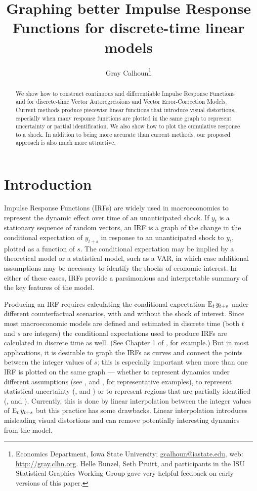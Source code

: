 \documentclass[12pt,fleqn]{article}
\title{Graphing better Impulse Response Functions for discrete-time
  linear models}
\author{Gray Calhoun\thanks{%
    Economics Department, Iowa State University;%
    \protect\url{gcalhoun@iastate.edu},%
    web: \protect\url{http://gray.clhn.org}.%
    Helle Bunzel, Seth Pruitt, and participants in the ISU Statistical
    Graphics Working Group gave very helpful feedback on early
    versions of this paper.}}
\begin{document}
\maketitle
\begin{abstract}\noindent%
  We show how to construct continuous and differentiable
  Impulse Response Functions and for discrete-time Vector Autoregressions
  and Vector Error-Correction Models. Current methods produce piecewise linear
  functions that introduce visual distortions, especially when many
  response functions are plotted in the same graph to represent
  uncertainty or partial identification. We also show how to plot the
  cumulative response to a shock. In addition to being more accurate
  than current methods, our proposed approach is also much more attractive.
\end{abstract}

\tableofcontents
\newpage

\section{Introduction}
\label{S1}

Impulse Response Functions (IRFs) are widely used in macroeconomics
to represent the dynamic effect over time of an unanticipated
shock. If $y_t$ is a stationary sequence of random vectors, an IRF
is a graph of the change in the conditional expectation of $y_{t+s}$
in response to an unanticipated shock to $y_t$, plotted as a function
of $s$. The conditional expectation may be implied by a theoretical
model or a statistical model, such as a VAR, in which case additional
assumptions may be necessary to identify the shocks of economic
interest. In either of these cases, IRFs provide a parsimonious and
interpretable summary of the key features of the model.

Producing an IRF requires calculating the conditional expectation
$\operatorname{E}_t y_{t+s}$ under different counterfactual scenarios, with and
without the shock of interest. Since most macroeconomic models are
defined and estimated in discrete time (both $t$ and $s$ are integers)
the conditional expectations used to produce IRFs are calculated in
discrete time as well. (See Chapter 1 of \citealp{Ham:94}, for
example.) But in most applications, it is desirable to graph the IRFs
as curves and connect the points between the integer values of $s$;
this is especially important when more than one IRF is plotted on
the same graph --- whether to represent dynamics under different
assumptions (see \citealp{BeM:98}, and \citealp{StW:01}, for
representative examples), to represent statistical uncertainty
(\citealp{Kil:98}, and \citealp{SiZ:99}) or to represent regions that
are partially identified (\citealp{Uhl:05}, and
\citealp{InK:13}). Currently, this is done by linear interpolation
between the integer values of $\operatorname{E}_t y_{t+s}$ but this practice has
some drawbacks. Linear interpolation introduces misleading visual
distortions and can remove potentially interesting dynamics from the
model.
\end{document}
